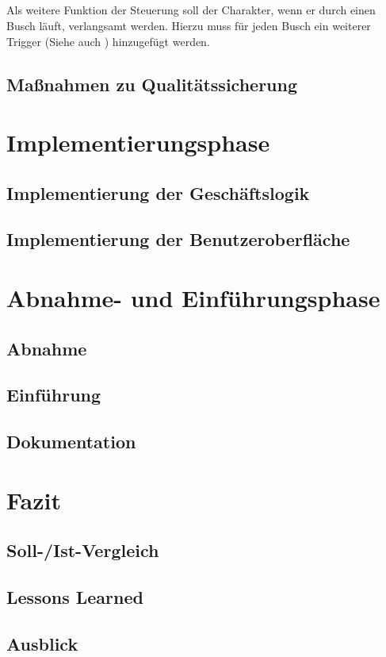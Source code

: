 \paragraph{}
Als weitere Funktion der Steuerung soll der Charakter, wenn er durch einen Busch läuft, verlangsamt werden. Hierzu muss für jeden Busch ein weiterer Trigger (Siehe auch ) hinzugefügt werden.

\section{Maßnahmen zu Qualitätssicherung}
\paragraph{}


\chapter{Implementierungsphase}
\section{Implementierung der Geschäftslogik}
\paragraph{}


\section{Implementierung der Benutzeroberfläche}
\paragraph{}

\chapter{Abnahme- und Einführungsphase}

\section{Abnahme}
\section{Einführung}
\section{Dokumentation}

\chapter{Fazit}
\section{Soll-/Ist-Vergleich}
\section{Lessons Learned}
\section{Ausblick}
